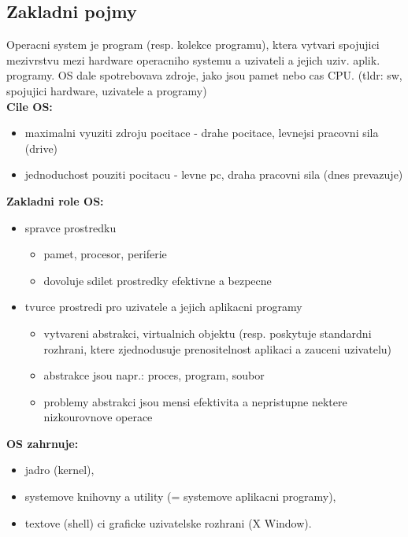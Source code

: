 \documentclass[a4paper, 11pt]{article}
\begin{document}
\subsection{Zakladni pojmy}

Operacni system je program (resp. kolekce programu), ktera vytvari spojujici mezivrstvu mezi hardware operacniho systemu  a uzivateli a jejich uziv. aplik. programy. OS dale spotrebovava zdroje, jako jsou pamet nebo cas CPU.
(tldr: sw, spojujici hardware, uzivatele a programy) \\

\noindent\textbf{Cile OS:}
\begin{itemize}
    \item maximalni vyuziti zdroju pocitace - drahe pocitace, levnejsi pracovni sila (drive)
    \item jednoduchost pouziti pocitacu - levne pc, draha pracovni sila (dnes prevazuje) \\
\end{itemize}

\noindent\textbf{Zakladni role OS:}
\begin{itemize}
    \item spravce prostredku
        \begin{itemize}
            \item pamet, procesor, periferie
             \item dovoluje sdilet prostredky efektivne a bezpecne
        \end{itemize}
    \item tvurce prostredi pro uzivatele a jejich aplikacni programy
        \begin{itemize}
            \item vytvareni abstrakci, virtualnich objektu (resp. poskytuje standardni rozhrani, ktere zjednodusuje prenositelnost aplikaci a zauceni uzivatelu)
            \item abstrakce jsou napr.: proces, program, soubor
            \item problemy abstrakci jsou mensi efektivita a nepristupne nektere nizkourovnove operace \\
        \end{itemize}
\end{itemize}

\noindent\textbf{OS zahrnuje:}
\begin{itemize}
    \item jadro (kernel),
    \item systemove knihovny a utility (= systemove aplikacni programy),
    \item textove (shell) ci graficke uzivatelske rozhrani (X Window). \\
\end{itemize}
\end{document}
